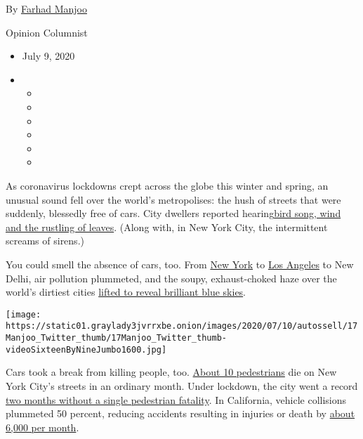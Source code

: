By \href{https://www.nytimes3xbfgragh.onion/by/farhad-manjoo}{Farhad
Manjoo}

Opinion Columnist

\begin{itemize}
\item
  July 9, 2020
\item
  \begin{itemize}
  \item
  \item
  \item
  \item
  \item
  \item
  \end{itemize}
\end{itemize}

As coronavirus lockdowns crept across the globe this winter and spring,
an unusual sound fell over the world's metropolises: the hush of streets
that were suddenly, blessedly free of cars. City dwellers reported
hearing\href{https://www.nytimes3xbfgragh.onion/interactive/2020/05/22/upshot/coronavirus-quiet-city-noise.html}{bird
song, wind and the rustling of leaves}. (Along with, in New York City,
the intermittent screams of sirens.)

You could smell the absence of cars, too. From
\href{https://www.nydailynews.com/coronavirus/ny-corionavirus-environmental-benefit-unlikely-to-last-20200406-vx5v3dn6evhbhdjdmarcyihleu-story.html}{New
York} to
\href{https://www.lamag.com/citythinkblog/air-quality-covid/}{Los
Angeles} to New Delhi, air pollution plummeted, and the soupy,
exhaust-choked haze over the world's dirtiest cities
\href{https://www.theguardian.com/environment/2020/apr/11/positively-alpine-disbelief-air-pollution-falls-lockdown-coronavirus}{lifted
to reveal brilliant blue skies}.

\texttt{[image: https://static01.graylady3jvrrxbe.onion/images/2020/07/10/autossell/17Manjoo\_Twitter\_thumb/17Manjoo\_Twitter\_thumb-videoSixteenByNineJumbo1600.jpg]}

Cars took a break from killing people, too.
\href{https://www.nytimes3xbfgragh.onion/2020/03/10/nyregion/nyc-deaths-pedestrian-cycling.html}{About
10 pedestrians} die on New York City's streets in an ordinary month.
Under lockdown, the city went a record
\href{https://www.cnn.com/2020/05/13/us/new-york-city-pedestrian-deaths/index.html}{two
months without a single pedestrian fatality}. In California, vehicle
collisions plummeted 50 percent, reducing accidents resulting in
injuries or death by
\href{https://roadecology.ucdavis.edu/files/content/projects/COVID_CHIPs_Impacts_updated_415.pdf}{about
6,000 per month}.

